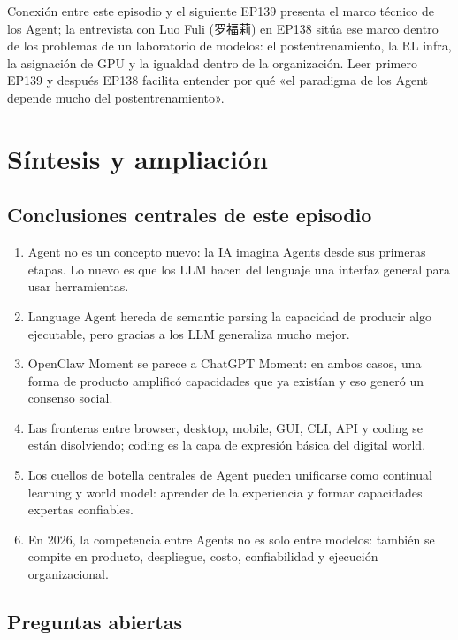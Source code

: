 \documentclass[a4paper]{article}
\begin{document}
\begin{knowledgebox}{Conexión entre este episodio y el siguiente}
EP139 presenta el marco técnico de los Agent; la entrevista con Luo Fuli (罗福莉) en EP138 sitúa ese marco dentro de los problemas de un laboratorio de modelos: el postentrenamiento, la RL infra, la asignación de GPU y la igualdad dentro de la organización. Leer primero EP139 y después EP138 facilita entender por qué «el paradigma de los Agent depende mucho del postentrenamiento».
\end{knowledgebox}
\section{Síntesis y ampliación}

\subsection{Conclusiones centrales de este episodio}

\begin{enumerate}
\item Agent no es un concepto nuevo: la IA imagina Agents desde sus primeras etapas. Lo nuevo es que los LLM hacen del lenguaje una interfaz general para usar herramientas.
\item Language Agent hereda de semantic parsing la capacidad de producir algo ejecutable, pero gracias a los LLM generaliza mucho mejor.
\item OpenClaw Moment se parece a ChatGPT Moment: en ambos casos, una forma de producto amplificó capacidades que ya existían y eso generó un consenso social.
\item Las fronteras entre browser, desktop, mobile, GUI, CLI, API y coding se están disolviendo; coding es la capa de expresión básica del digital world.
\item Los cuellos de botella centrales de Agent pueden unificarse como continual learning y world model: aprender de la experiencia y formar capacidades expertas confiables.
\item En 2026, la competencia entre Agents no es solo entre modelos: también se compite en producto, despliegue, costo, confiabilidad y ejecución organizacional.
\end{enumerate}

\subsection{Preguntas abiertas}
\end{document}
